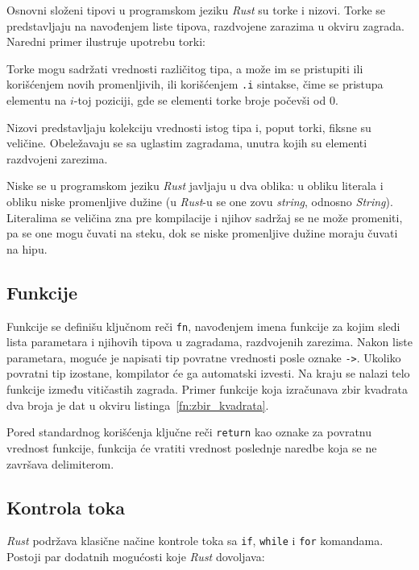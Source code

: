 \documentclass[12pt,oneside]{memoir}
\begin{document}
Osnovni složeni tipovi u programskom jeziku \emph{Rust} su torke
i nizovi. Torke se predstavljaju na navođenjem liste tipova, razdvojene zarazima u okviru
zagrada. Naredni primer ilustruje upotrebu torki:



Torke mogu sadržati vrednosti različitog tipa, a može im se pristupiti
ili korišćenjem novih promenljivih, ili korišćenjem \texttt{.i} sintakse,
čime se pristupa elementu na $i$-toj poziciji, gde se elementi torke broje
počevši od $0$.

Nizovi predstavljaju kolekciju vrednosti istog tipa i, poput torki,
fiksne su veličine. Obeležavaju se sa uglastim zagradama, unutra kojih su elementi
razdvojeni zarezima.

Niske se u programskom jeziku \emph{Rust} javljaju u dva oblika:
u obliku literala i obliku niske promenljive dužine
(u \emph{Rust}-u se one zovu \emph{string}, odnosno \emph{String}).
Literalima se veličina zna pre kompilacije i njihov sadržaj se ne može promeniti,
pa se one mogu čuvati na steku, dok se niske promenljive dužine moraju čuvati na hipu.

\subsection{Funkcije}
Funkcije se definišu ključnom reči \texttt{fn}, navođenjem imena funkcije za kojim sledi
lista parametara i njihovih tipova u zagradama, razdvojenih zarezima. Nakon liste parametara,
moguće je napisati tip povratne vrednosti posle oznake \texttt{->}. Ukoliko povratni tip izostane,
kompilator će ga automatski izvesti. Na kraju se nalazi telo funkcije između vitičastih zagrada.
Primer funkcije koja izračunava zbir kvadrata dva broja je dat u okviru listinga~\ref{fn:zbir_kvadrata}.



\noindent
Pored standardnog korišćenja ključne reči \texttt{return} kao oznake za povratnu vrednost funkcije,
funkcija će vratiti vrednost poslednje naredbe koja se ne završava delimiterom.

\subsection{Kontrola toka}
\emph{Rust} podržava klasične načine kontrole toka sa \texttt{if},
\texttt{while} i \texttt{for} komandama. Postoji par dodatnih mogućosti
koje \emph{Rust} dovoljava:
\end{document}
